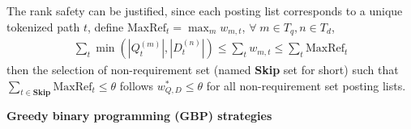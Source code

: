 \documentclass[runningheads]{llncs}
\begin{document}
The rank safety can be justified, since each posting list corresponds to a unique tokenized path $t$, define $\text{MaxRef}_t = \max_m w_{m, t}$,
$\forall\; m \in T_q, n \in T_d$,
\begin{align}
\label{eq:6}
\sum_t \min(|Q^{(m)}_t|, |D^{(n)}_t|) \le \sum_t w_{m,t} \le \sum_t \text{MaxRef}_t
\end{align}
then the selection of non-requirement set (named \textbf{Skip} set for short) such that 
$\sum_{t \in \textbf{Skip}} \text{MaxRef}_t \le \theta$
follows $w^*_{Q, D} \le \theta$ for all non-requirement set posting lists.

\vspace{0.1in}
\noindent \textbf{Greedy binary programming (GBP) strategies}\;
% 
% 
% 
\end{document}
